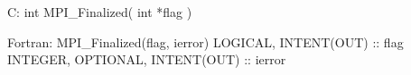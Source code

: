 C:
int MPI_Finalized( int *flag )

Fortran:
MPI_Finalized(flag, ierror)
LOGICAL, INTENT(OUT) :: flag
INTEGER, OPTIONAL, INTENT(OUT) :: ierror
